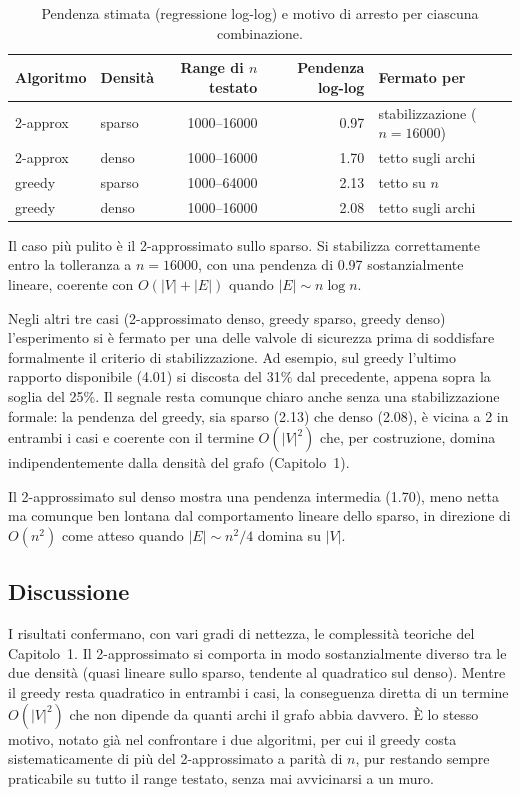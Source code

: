 \begin{table}[htbp]
    \centering
    \begin{tabular}{@{}llrrl@{}}
        \toprule
        Algoritmo & Densità & Range di $n$ testato & Pendenza log-log & Fermato per \\
        \midrule
        2-approx & sparso & 1000--16000 & 0.97 & stabilizzazione ($n=16000$) \\
        2-approx & denso  & 1000--16000 & 1.70 & tetto sugli archi \\
        greedy   & sparso & 1000--64000 & 2.13 & tetto su $n$ \\
        greedy   & denso  & 1000--16000 & 2.08 & tetto sugli archi \\
        \bottomrule
    \end{tabular}
    \caption{Pendenza stimata (regressione log-log) e motivo di arresto per ciascuna combinazione.}
    \label{tab:exp3-pendenze}
\end{table}

Il caso più pulito è il 2-approssimato sullo sparso. 
Si stabilizza correttamente entro la tolleranza a $n=16000$, con una pendenza di 0.97 sostanzialmente lineare, coerente con $O(|V|+|E|)$ quando $|E|\sim n\log n$. 

Negli altri tre casi (2-approssimato denso, greedy sparso, greedy denso) l'esperimento si è fermato per una delle valvole di sicurezza prima di soddisfare formalmente il criterio di stabilizzazione. 
Ad esempio, sul greedy l'ultimo rapporto disponibile (4.01) si discosta del 31\% dal precedente, appena sopra la soglia del 25\%. Il segnale resta comunque chiaro anche senza una stabilizzazione formale: la pendenza del greedy, sia sparso (2.13) che denso (2.08), è vicina a 2 in entrambi i casi e coerente con il termine $O(|V|^2)$ che, per costruzione, domina indipendentemente dalla densità del grafo (Capitolo~1). 

Il 2-approssimato sul denso mostra una pendenza intermedia (1.70), meno netta ma comunque ben lontana dal comportamento lineare dello sparso, in direzione di $O(n^2)$ come atteso quando $|E|\sim n^2/4$ domina su $|V|$.

\subsection{Discussione}

I risultati confermano, con vari gradi di nettezza, le complessità teoriche del Capitolo~1. 
Il 2-approssimato si comporta in modo sostanzialmente diverso tra le due densità (quasi lineare sullo sparso, tendente al quadratico sul denso). 
Mentre il greedy resta quadratico in entrambi i casi, la conseguenza diretta di un termine $O(|V|^2)$ che non dipende da quanti archi il grafo abbia davvero. 
È lo stesso motivo, notato già nel confrontare i due algoritmi, per cui il greedy costa sistematicamente di più del 2-approssimato a parità di $n$, pur restando sempre praticabile su tutto il range testato, senza mai avvicinarsi a un muro.

